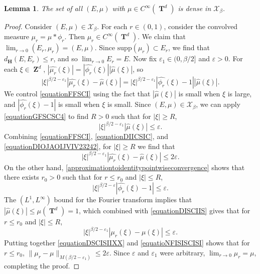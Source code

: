\documentclass[12pt,reqno]{article}
\numberwithin{equation}{section}
\DeclareMathOperator{\ZZ}{\mathbf{Z}}
\DeclareMathOperator{\TT}{\mathbf{T}}
\newtheorem{lemma}[theorem]{Lemma}
\numberwithin{theorem}{section}
\begin{document}
\begin{lemma} \label{smoothdensitylemma}
    The set of all $(E,\mu)$ with $\mu \in C^\infty(\TT^d)$ is dense in $\mathcal{X}_\beta$.
\end{lemma}
\begin{proof}
    Consider $(E,\mu) \in \mathcal{X}_\beta$. For each $r \in (0,1)$, consider the convolved measure $\mu_r = \mu * \phi_r$. Then $\mu_r \in C^\infty(\TT^d)$. We claim that $\lim_{r \to 0} (E_r,\mu_r) = (E,\mu)$. Since $\text{supp}(\mu_r) \subset E_r$, we find that $d_{\mathbf{H}}(E,E_r) \leq r$, and so $\lim_{r \to 0} E_r = E$. Now fix $\varepsilon_1 \in (0,\beta/2]$ and $\varepsilon > 0$. For each $\xi \in \ZZ^d$, $|\widehat{\mu_r}(\xi)| = |\widehat{\phi_r}(\xi)| |\widehat{\mu}(\xi)|$, so
    \begin{equation} \label{equationFFSCI}
        |\xi|^{\beta/2 - \varepsilon_1} |\widehat{\mu_r}(\xi) - \widehat{\mu}(\xi)| = |\xi|^{\beta/2 - \varepsilon_1} |\widehat{\phi_r}(\xi) - 1| |\widehat{\mu}(\xi)|.
    \end{equation}
    We control \eqref{equationFFSCI} using the fact that $|\widehat{\mu}(\xi)|$ is small when $\xi$ is large, and $|\widehat{\phi_r}(\xi) - 1|$ is small when $\xi$ is small. Since $(E,\mu) \in \mathcal{X}_\beta$, we can apply \eqref{equationGFSCSC4} to find $R > 0$ such that for $|\xi| \geq R$,
    \begin{equation} \label{equationDIICSIC}
        |\xi|^{\beta/2 - \varepsilon_1} |\widehat{\mu}(\xi)| \leq \varepsilon.
    \end{equation}
    Combining \eqref{equationFFSCI}, \eqref{equationDIICSIC}, and \eqref{equationDIOJAOIJVIV23242}, for $|\xi| \geq R$ we find that
    \begin{equation} \label{equationDSCISIIXX}
        |\xi|^{\beta/2 - \varepsilon_1} |\widehat{\mu_r}(\xi) - \widehat{\mu}(\xi)| \leq 2 \varepsilon.
    \end{equation}
    On the other hand, \eqref{approximationtoidentitypointwiseconvergence} shows that there exists $r_0 > 0$ such that for $r \leq r_0$ and $|\xi| \leq R$,
    \begin{equation} \label{equationDISCIIS}
        |\xi|^{\beta/2 - \varepsilon} |\widehat{\phi_r}(\xi) - 1| \leq \varepsilon.
    \end{equation}
    The $(L^1,L^\infty)$ bound for the Fourier transform implies that $|\widehat{\mu}(\xi)| \leq \mu(\TT^d) = 1$, which combined with \eqref{equationDISCIIS} gives that for $r \leq r_0$ and $|\xi| \leq R$,
    \begin{equation} \label{equatioNFISISCISI}
        |\xi|^{\beta/2 - \varepsilon_1} |\mu_r(\xi) - \mu(\xi)| \leq \varepsilon.
    \end{equation}
    Putting together \eqref{equationDSCISIIXX} and \eqref{equatioNFISISCISI} shows that for $r \leq r_0$, $\| \mu_r - \mu \|_{M(\beta/2 - \varepsilon_1)} \leq 2\varepsilon$. Since $\varepsilon$ and $\varepsilon_1$ were arbitrary, $\lim_{r \to 0} \mu_r = \mu$, completing the proof.
\end{proof}
\end{document}
